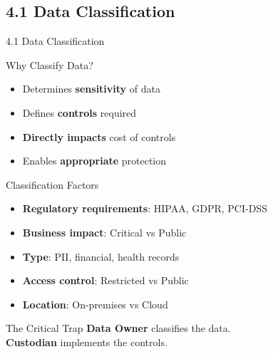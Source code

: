 \documentclass{beamer}
\begin{document}
	\subsection{4.1 Data Classification}
	\begin{frame}{4.1 Data Classification}
		\begin{block}{Why Classify Data?}
			\begin{itemize}
				\item Determines \textbf{sensitivity} of data
				\item Defines \textbf{controls} required
				\item \textbf{Directly impacts} cost of controls
				\item Enables \textbf{appropriate} protection
			\end{itemize}
		\end{block}
		
		\begin{block}{Classification Factors}
			\begin{itemize}
				\item \textbf{Regulatory requirements}: HIPAA, GDPR, PCI-DSS
				\item \textbf{Business impact}: Critical vs Public
				\item \textbf{Type}: PII, financial, health records
				\item \textbf{Access control}: Restricted vs Public
				\item \textbf{Location}: On-premises vs Cloud
			\end{itemize}
		\end{block}
		
		\begin{alertblock}{The Critical Trap}
			\textbf{Data Owner} classifies the data. \\
			\textbf{Custodian} implements the controls.
		\end{alertblock}
	\end{frame}
	
\end{document}

